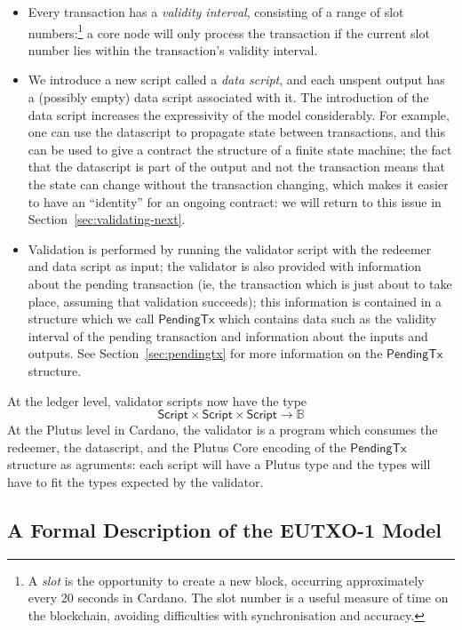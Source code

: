 \documentclass[a4paper]{article}
\renewcommand{\i}{\textit}  %
\newcommand{\s}{\textsf}  %
\theoremstyle{definition}  %
\newcommand{\script}{\ensuremath{\s{Script}}}
\newcommand{\ptx}{\ensuremath{\s{PendingTx}}}
\newcommand\B{\ensuremath{\mathbb{B}}}
\begin{document}
\begin{itemize}
\item Every transaction has a \textit{validity interval}, consisting
  of a range of slot numbers:\footnote{A \textit{slot} is the
    opportunity to create a new block, occurring approximately every
    20 seconds in Cardano.  The slot number is a useful measure of
    time on the blockchain, avoiding difficulties with synchronisation
    and accuracy.} a core node will only process the transaction if
  the current slot number lies within the transaction's validity
  interval.

\item We introduce a new script called a \i{data script}, and each
  unspent output has a (possibly empty) data script associated with
  it.  The introduction of the data script increases the expressivity
  of the model considerably. For example, one can use the datascript
  to propagate state between transactions, and this can be used to
  give a contract the structure of a finite state machine; the fact
  that the datascript is part of the output and not the transaction
  means that the state can change without the transaction changing,
  which makes it easier to have an ``identity'' for an ongoing
  contract: we will return to this issue in
  Section~\ref{sec:validating-next}.
  
\item Validation is performed by running the validator script with the
  redeemer and data script as input; the validator is also provided
  with information about the pending transaction (ie, the transaction
  which is just about to take place, assuming that validation
  succeeds); this information is contained in a structure which we call
  \ptx{} which contains data such as the validity interval of the
  pending transaction and information about the inputs and outputs.
  See Section~\ref{sec:pendingtx} for more information on the $\ptx$
  structure.
  
\end{itemize}


\noindent At the ledger level, validator scripts now have the type
$$
\script \times \script \times \script \rightarrow \B
$$
At the Plutus level in Cardano, the validator is a program which
consumes the redeemer, the datascript, and the Plutus Core encoding of
the $\ptx$ structure as agruments: each script will have a Plutus type
and the types will have to fit the types expected by the validator.

\subsection{A Formal Description of the EUTXO-1 Model}
\label{section:eutxo-spec}
\end{document}
